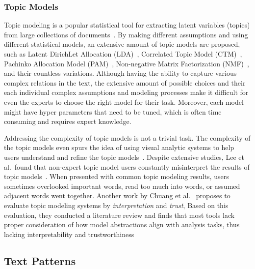 \subsubsection{Topic Models}
Topic modeling is a popular statistical tool for extracting latent variables (topics) from large collections of documents~\cite{vayansky2020topicreview}.
By making different assumptions and using different statistical models, an extensive amount of topic models are proposed,
such as Latent DirichLet Allocation (LDA)~\cite{blei2003LDA}, Correlated Topic Model (CTM)~\cite{blei2006correlated}, Pachinko Allocation Model (PAM)~\cite{li2006pachinko}, Non-negative Matrix Factorization (NMF)~\cite{lee1999NMF},
and their countless variations.
Although having the ability to capture various complex relations in the text, the extensive amount of possible choices and their each individual complex assumptions and modeling processes make it difficult for even the experts to choose the right model for their task.
Moreover, each model might have hyper parameters that need to be tuned, which is often time consuming and requires expert knowledge.

Addressing the complexity of topic models is not a trivial task.
The complexity of the topic models even spurs the idea of using visual analytic systems to help users understand and refine the topic models~\cite{el2017progressive, choo2013utopian, lee2012ivisclustering, kim2016topiclens, chaney2012visualizing, gretarsson2012topicnets}.
Despite extensive studies, Lee et al.\ found that non-expert topic model users constantly misinterpret the results of topic models~\cite{lee2017human}. 
When presented with common topic modeling results, users sometimes overlooked important words, read too much into words, or assumed adjacent words went together.
Another work by Chuang et al.~\cite{chuang2012interpretation} proposes to evaluate topic modeling systems by \textit{interpretation} and \textit{trust},
Based on this evaluation, they conducted a literature review and finds that most tools lack proper consideration of how model abstractions align with analysis tasks, thus lacking interpretability and trustworthiness

\subsection{Text Patterns}
